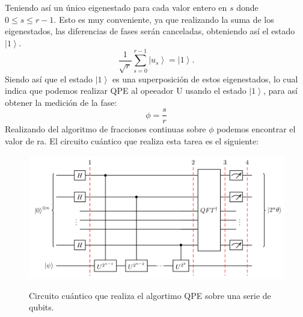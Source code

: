 Teniendo así un único eigenestado para cada valor entero en $s$ donde $0\leq s \leq r-1$. Esto es muy conveniente, ya que realizando la suma de los eigenestados, las diferencias de fases
serán canceladas, obteniendo así el estado $ \left| 1 \right\rangle$.
\begin{equation*}
    \frac{1}{\sqrt{r}} \sum\limits_{s=0}^{r-1} \left|u_s \right\rangle =  \left| 1 \right\rangle.
\end{equation*}
Siendo así que el estado $ \left| 1 \right\rangle$ es una superposición de estos eigenestados, lo cual indica que podemos realizar 
QPE al opeeador U usando el estado $ \left| 1 \right\rangle$, para así obtener la medición de la fase:
\begin{equation*}
    \phi = \frac{s}{r}
\end{equation*}
Realizando del algoritmo de fracciones continuas sobre $\phi$ podemos encontrar el valor de ra. El circuito cuántico que realiza esta tarea es el siguiente:
\begin{figure}[H]
    \includegraphics[scale=0.4]{../Graphics/qpe.png}
    \label{fig:qpe}
    \caption{Circuito cuántico que realiza el algortimo QPE sobre una serie de qubits.}
\end{figure}
